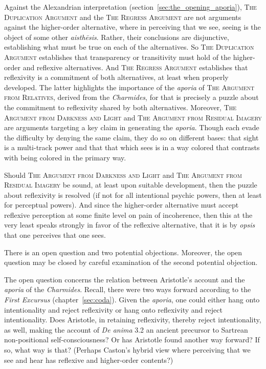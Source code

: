 Against the Alexandrian interpretation (section~\ref{sec:the_opening_aporia}), \textsc{The Duplication Argument} and the \textsc{The Regress Argument} are not arguments against the higher-order alternative, where in perceiving that we see, seeing is the object of some other \emph{aisthēsis}. Rather, their conclusions are disjunctive, establishing what must be true on each of the alternatives. So \textsc{The Duplication Argument} establishes that transparency or transitivity must hold of the higher-order and reflexive alternatives. And \textsc{The Regress Argument} establishes that reflexivity is a commitment of both alternatives, at least when properly developed. The latter highlights the importance of the \emph{aporia} of \textsc{The Argument from Relatives}, derived from the \emph{Charmides}, for that is precisely a puzzle about the commitment to reflexivity shared by both alternatives. Moreover, \textsc{The Argument from Darkness and Light} and \textsc{The Argument from Residual Imagery} are arguments targeting a key claim in generating the \emph{aporia}. Though each evade the difficulty by denying the same claim, they do so on different bases: that sight is a multi-track power and that that which sees is in a way colored that contrasts with being colored in the primary way.

Should \textsc{The Argument from Darkness and Light} and \textsc{The Argument from Residual Imagery} be sound, at least upon suitable development, then the puzzle about reflexivity is resolved (if not for all intentional psychic powers, then at least for perceptual powers). And since the higher-order alternative must accept reflexive perception at some finite level on pain of incoherence, then this at the very least speaks strongly in favor of the reflexive alternative, that it is by \emph{opsis} that one perceives that one sees.

There is an open question and two potential objections. Moreover, the open question may be closed by careful examination of the second potential objection.

The open question concerns the relation between Aristotle's account and the \emph{aporia} of the \emph{Charmides}. Recall, there were two ways forward according to the \emph{First Excursus} (chapter~\ref{sec:coda}). Given the \emph{aporia}, one could either hang onto intentionality and reject reflexivity or hang onto reflexivity and reject intentionality. Does Aristotle, in retaining reflexivity, thereby reject intentionality, as well, making the account of \emph{De anima} 3.2 an ancient precursor to Sartrean non-positional self-consciousness? Or has Aristotle found another way forward? If so, what way is that? (Perhaps Caston's \citeyear{caston02} hybrid view where perceiving that we see and hear has reflexive and higher-order contents?)


